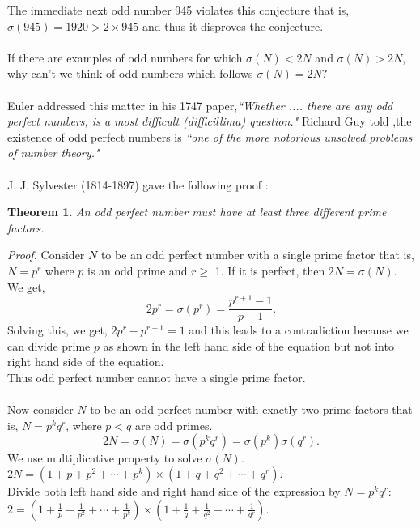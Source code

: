 \documentclass[a4paper,reqno,11pt]{book}
\theoremstyle{plain}%
\newtheorem{thm}{Theorem}[chapter]
\theoremstyle{definition}
\begin{document}
The immediate next odd number 945 violates this conjecture that is, \\$\sigma(945) = 1920 > 2 \times 945$ and thus it disproves the conjecture.\\
\\
If there are examples of odd numbers for which $\sigma(N) < 2N$ and $\sigma(N) > 2N$, why can't we think of odd numbers which follows $\sigma(N) = 2N ? $\\
\\
Euler addressed this matter in his 1747 paper,\textit{``Whether .... there are any odd perfect numbers, is a most difficult (difficillima) question."}
Richard Guy told ,the existence of odd perfect numbers is \textit{``one of the 
more notorious unsolved problems of number theory."}\\
\\
J. J. Sylvester (1814-1897) gave the following proof :\\
\begin{thm}\label{thm:Type 1} \textit{An odd perfect number must have at least three different prime factors.}\\
\end{thm}
\noindent \textit{Proof.} Consider $N$ to be an odd perfect number with a single prime 
factor that is, $N = p^r$ where $p$ is an odd prime and $r \geq$ 1. If it is perfect, then $2N = \sigma(N)$. We get,\\
$$ 2p^r = \sigma(p^r) = \frac{p^{r+1}-1}{p-1}.$$
Solving this, we get, $2p^r - p^{r+1} = 1$ and this leads to a contradiction because we can divide prime $p$ as shown in the left hand side of the equation but not into right hand side of the equation.\\
Thus odd perfect number cannot have a single prime factor.\\
\\
\noindent Now consider $N$ to be an odd perfect number with exactly two prime factors that is, $N = p^kq^r$, where $p < q$ are odd primes. \\
$$2N = \sigma(N) = \sigma(p^kq^r) = \sigma(p^k)\sigma(q^r).$$
We use multiplicative property to solve $\sigma(N)$.\\
$2N = (1 + p + p^2 + \cdots + p^k) \times (1 + q + q^2 + \cdots + q^r).$\\
Divide both left hand side and right hand side of the expression by $N = p^kq^r$:\\
$2 = (1 + \frac{1}{p} + \frac{1}{p^2} + \cdots + \frac{1}{p^k}) \times (1 + \frac{1}{q} + \frac{1}{q^2} + \cdots + \frac{1}{q^r}).$\\
\end{document}
